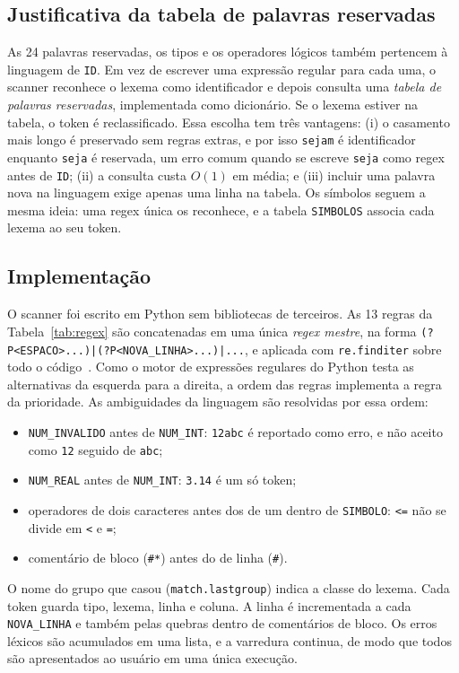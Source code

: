 \documentclass[conference]{IEEEtran}
\begin{document}
\subsection{Justificativa da tabela de palavras reservadas}
As 24 palavras reservadas, os tipos e os operadores lógicos também pertencem
à linguagem de \texttt{ID}. Em vez de escrever uma expressão regular para
cada uma, o scanner reconhece o lexema como identificador e depois consulta
uma \emph{tabela de palavras reservadas}, implementada como dicionário. Se o
lexema estiver na tabela, o token é reclassificado. Essa escolha tem três
vantagens: (i) o casamento mais longo é preservado sem regras extras, e por
isso \texttt{sejam} é identificador enquanto \texttt{seja} é reservada, um
erro comum quando se escreve \texttt{seja} como regex antes de \texttt{ID};
(ii) a consulta custa $O(1)$ em média; e (iii) incluir uma palavra nova na
linguagem exige apenas uma linha na tabela. Os símbolos seguem a mesma ideia:
uma regex única os reconhece, e a tabela \texttt{SIMBOLOS} associa cada
lexema ao seu token.

\subsection{Implementação}
O scanner foi escrito em Python sem bibliotecas de terceiros. As 13 regras da
Tabela~\ref{tab:regex} são concatenadas em uma única \emph{regex mestre}, na
forma \texttt{(?P<ESPACO>...)|(?P<NOVA\_LINHA>...)|...}, e aplicada com
\texttt{re.finditer} sobre todo o código~\cite{pyre}. Como o motor de expressões regulares
do Python testa as alternativas da esquerda para a direita, a ordem das regras
implementa a regra da prioridade. As ambiguidades da linguagem são resolvidas
por essa ordem:

\begin{itemize}
\item \texttt{NUM\_INVALIDO} antes de \texttt{NUM\_INT}: \texttt{12abc} é
reportado como erro, e não aceito como \texttt{12} seguido de \texttt{abc};
\item \texttt{NUM\_REAL} antes de \texttt{NUM\_INT}: \texttt{3.14} é um só token;
\item operadores de dois caracteres antes dos de um dentro de \texttt{SIMBOLO}:
\texttt{<=} não se divide em \texttt{<} e \texttt{=};
\item comentário de bloco (\texttt{\#*}) antes do de linha (\texttt{\#}).
\end{itemize}

O nome do grupo que casou (\texttt{match.lastgroup}) indica a classe do
lexema. Cada token guarda tipo, lexema, linha e coluna. A linha é
incrementada a cada \texttt{NOVA\_LINHA} e também pelas quebras dentro de
comentários de bloco. Os erros léxicos são acumulados em uma lista, e a
varredura continua, de modo que todos são apresentados ao usuário em uma
única execução.
\end{document}
